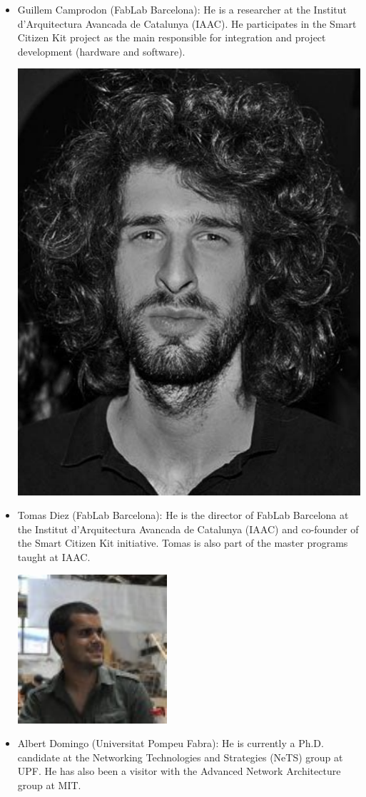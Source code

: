 \documentclass[a4paper,oneside]{book}   %
\begin{document}
\begin{itemize}
\begin{center}
\end{center}
\item Guillem Camprodon (FabLab Barcelona): He is a researcher at the Institut d'Arquitectura Avancada de Catalunya (IAAC). He participates in the Smart Citizen Kit project as the main responsible for integration and project development (hardware and software).
\begin{center}
\includegraphics[width=0.200\linewidth]{guillem}
\end{center}
\item Tomas Diez (FabLab Barcelona): He is the director of FabLab Barcelona at the Institut d'Arquitectura Avancada de Catalunya (IAAC) and co-founder of the Smart Citizen Kit initiative. Tomas is also part of the master programs taught at IAAC.
\begin{center}
\includegraphics[width=0.200\linewidth]{tomas}
\end{center}
\item Albert Domingo (Universitat Pompeu Fabra):
He is currently a Ph.D. candidate at the Networking Technologies and Strategies (NeTS) group at UPF. He has also been a visitor with the Advanced Network Architecture group at MIT.


\end{itemize}
\end{document}
